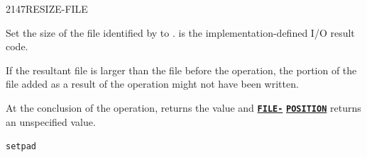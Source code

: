 \begin{worddef}{2147}{RESIZE-FILE}
\item {}

	Set the size of the file identified by  to
	.  is the implementation-defined I/O result
	code.

	If the resultant file is larger than the file before the
	operation, the portion of the file added as a result of the
	operation might not have been written.

	At the conclusion of the operation,  returns
	the value  and
	\hyperref{}{file}{FILE-POSITION}{\textbf{\texttt{FILE-}}} \linebreak
	\hyperref{}{file}{FILE-POSITION}{\textbf{\texttt{POSITION}}}
	returns an unspecified value.


	\begin{testing} %
		\texttt{setpad} \\
		 \\
		 \\
		 \\
		 \\
		 \\
		 \\
		 \\
		 \\
		 \\
		 \\
		 \\
		 \\
	\end{testing}
\end{worddef}


